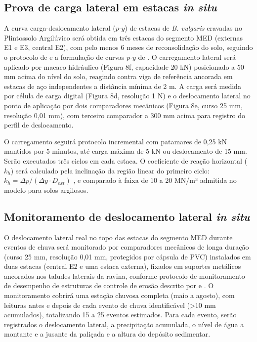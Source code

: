 \documentclass[
  brazilian,
  authoryear,
  preprint]{elsarticle}
\begin{document}
\subsection{\texorpdfstring{Prova de carga lateral em estacas \emph{in
situ}}{Prova de carga lateral em estacas in situ}}\label{prova-de-carga-lateral-em-estacas-in-situ}

A curva carga-deslocamento lateral (\(p\)-\(y\)) de estacas de \emph{B.
vulgaris} cravadas no Plintossolo Argilúvico será obtida em três estacas
do segmento MED (externas E1 e E3, central E2), com pelo menos 6 meses
de reconsolidação do solo, seguindo o protocolo de \citet{broms_1964} e
a formulação de curvas \(p\)-\(y\) de \citet{matlock_1970}. O
carregamento lateral será aplicado por macaco hidráulico (Figura 8f,
capacidade 20 kN) posicionado a 50 mm acima do nível do solo, reagindo
contra viga de referência ancorada em estacas de aço independentes a
distância mínima de 2 m. A carga será medida por célula de carga digital
(Figura 8d, resolução 1 N) e o deslocamento lateral no ponto de
aplicação por dois comparadores mecânicos (Figura 8e, curso 25 mm,
resolução 0,01 mm), com terceiro comparador a 300 mm acima para registro
do perfil de deslocamento.

O carregamento seguirá protocolo incremental com patamares de 0,25 kN
mantidos por 5 minutos, até carga máxima de 5 kN ou deslocamento de 15
mm. Serão executados três ciclos em cada estaca. O coeficiente de reação
horizontal (\(k_h\)) será calculado pela inclinação da região linear do
primeiro ciclo: \(k_h = \Delta p / (\Delta y \cdot D_{ext})\)
\citep{broms_1964}, e comparado à faixa de 10 a 20 MN/m³ admitida no
modelo para solos argilosos.

\subsection{\texorpdfstring{Monitoramento de deslocamento lateral
\emph{in
situ}}{Monitoramento de deslocamento lateral in situ}}\label{monitoramento-de-deslocamento-lateral-in-situ}

O deslocamento lateral real no topo das estacas do segmento MED durante
eventos de chuva será monitorado por comparadores mecânicos de longa
duração (curso 25 mm, resolução 0,01 mm, protegidos por cápsula de PVC)
instalados em duas estacas (central E2 e uma estaca externa), fixados em
suportes metálicos ancorados nos taludes laterais da ravina, conforme
protocolo de monitoramento de desempenho de estruturas de controle de
erosão descrito por \citet{bombino_et_al_2007} e
\citet{tardio_mickovski_2017}. O monitoramento cobrirá uma estação
chuvosa completa (maio a agosto), com leituras antes e depois de cada
evento de chuva identificável (\textgreater10 mm acumulados),
totalizando 15 a 25 eventos estimados. Para cada evento, serão
registrados o deslocamento lateral, a precipitação acumulada, o nível de
água a montante e a jusante da paliçada e a altura do depósito
sedimentar.
\end{document}
